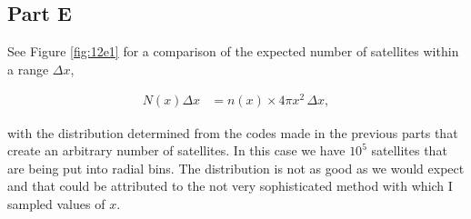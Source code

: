 \subsection{Part E}

See Figure \ref{fig:12e1} for a comparison of the expected number of satellites within a range $\Delta x$,

\begin{align}
N(x)\Delta x &= n(x) \times 4\pi x^{2} \, \Delta x,
\end{align}

with the distribution determined from the codes made in the previous parts that create an arbitrary number of satellites. In this case we have $10^{5}$ satellites that are being put into radial bins. The distribution is not as good as we would expect and that could be attributed to the not very sophisticated method with which I sampled values of $x$.



